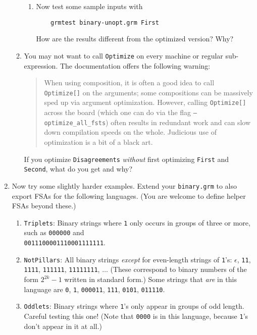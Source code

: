 \documentclass[11pt]{article}
\newcommand{\handinsym}{\color{blue}{\HandLeftUp}}
\newcounter{handin}
\newcommand{\handin}{\stepcounter{handin}\hspace{0pt}\marginpar{\hfill\handinsym$_{\arabic{handin}}$}}
\begin{document}
\begin{enumerate}
\begin{enumerate}
\begin{enumerate}
    \item Now test some sample inputs with
	\begin{verbatim}
	grmtest binary-unopt.grm First
	\end{verbatim}
      \handin How are the results different from the optimized version?
      Why?
    \end{enumerate}

  \item You may not want to call {\tt Optimize} on every machine
    or regular sub-expression.  The documentation offers the
    following warning:
    \begin{quote}\small
      When using composition, it is often a good idea to call {\tt
        Optimize[]} on the arguments; some compositions can be
      massively sped up via argument optimization. However, calling
      {\tt Optimize[]} across the board (which one can do via the flag
      {\tt --optimize\_all\_fsts}) often results in redundant work and
      can slow down compilation speeds on the whole. Judicious use of
      optimization is a bit of a black art.
    \end{quote}

    \handin If you optimize {\tt Disagreements} {\em without} first
    optimizing {\tt First} and {\tt Second}, what do you get and
    why?
  \end{enumerate}


\item\label{q:binary-harder} Now try some slightly harder examples. Extend your {\tt binary.grm}
  to also export FSAs for the following languages.  (You are welcome to
  define helper FSAs beyond these.)

  \begin{enumerate}
  \item \texttt{Triplets}: Binary strings where \texttt{1} only occurs in
    groups of three or more, such as \texttt{000000} and\\
    \texttt{0011100001110001111111}.
  \item \texttt{NotPillars}: All binary strings {\em except} for
    even-length strings of \texttt{1}'s: $\epsilon$,
    \texttt{11}, \texttt{1111}, \texttt{111111},
    \texttt{11111111}, $\ldots$ (These correspond to binary
    numbers of the form $2^{2k}-1$ written in standard form.)
    Some strings that {\em are} in this language are \texttt{0},
    \texttt{1}, \texttt{000011}, \texttt{111}, \texttt{0101},
    \texttt{011110}.
  \item \texttt{Oddlets}: Binary strings where \texttt{1}'s only
    appear in groups of odd length.  Careful testing this one!
    (Note that \texttt{0000} is in this language, because \texttt{1}'s
    don't appear in it at all.)

  \end{enumerate}
\end{enumerate}
\end{document}
